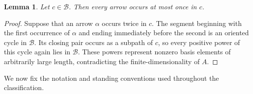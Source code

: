 \documentclass[11pt,a4paper,reqno]{amsart}
\newcommand{\mB}{\mathcal B}
\theoremstyle{plain}
\newtheorem{lemma}[lemma]{Lemma}
\theoremstyle{definition}
\numberwithin{equation}{section}
\begin{document}
	\begin{lemma}\label{basis-case}
		Let $c\in\mB$. Then every arrow occurs at most once in $c$.
	\end{lemma}
	
	\begin{proof}
		Suppose that an arrow $\alpha$ occurs twice in $c$. The segment beginning with the first occurrence of $\alpha$ and ending immediately before the second is an oriented cycle in $\mB$. Its closing pair occurs as a subpath of $c$, so every positive power of this cycle again lies in $\mB$. These powers represent nonzero basis elements of arbitrarily large length, contradicting the finite-dimensionality of $A$.
	\end{proof}
	
	We now fix the notation and standing conventions used throughout the classification.
	
\end{document}
